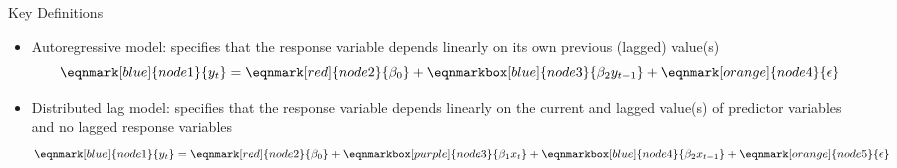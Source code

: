 \documentclass[english]{beamer}
\newcommand{\alertblue}[1]{{\color{blue}#1}}
\begin{document}
\begin{frame}{Key Definitions}
    \begin{itemize}
        \item \alertblue{Autoregressive model}: specifies that the \alertblue{response} variable depends linearly on its own previous (\alertblue{lagged}) value(s)
        \begin{equation*}
            \eqnmark[blue]{node1}{y_t}=
            \eqnmark[red]{node2}{\beta_0} +
            \eqnmarkbox[blue]{node3}{\beta_2 y_{t - 1}} + 
            \eqnmark[orange]{node4}{\epsilon}
        \end{equation*}

        \item \alertblue{Distributed lag model}: specifies that the \alertblue{response} variable depends linearly on the current and lagged value(s) of predictor variables and \alert {no lagged response variables} 
        \begin{equation*}
            \eqnmark[blue]{node1}{y_t}=
            \eqnmark[red]{node2}{\beta_0} +
            \eqnmarkbox[purple]{node3}{\beta_1 x_t} + 
            \eqnmarkbox[blue]{node4}{\beta_2 x_{t-1}} + 
            \eqnmark[orange]{node5}{\epsilon}
        \end{equation*}
    \end{itemize}
\end{frame}
\end{document}
